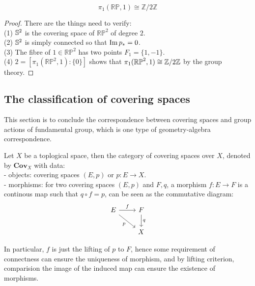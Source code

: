 \begin{corollary}
    \[\pi_1(\mathbb{RP},1) \cong \mathbb{Z}/2\mathbb{Z}\]
\end{corollary}
\begin{proof}
    There are the things need to verify:\\
    (1) \(\mathbb{S}^2\) is the covering space of \(\mathbb{RP}^2\) of degree \(2\).\\
    (2) \(\mathbb{S}^2\) is simply connected so that \(\operatorname{Im} p_* = 0\).\\
    (3) The fibre of \(1 \in \mathbb{RP}^2\) has two points \(F_1 = \{1,-1\}\).\\
    (4) \(2 = [\pi_1(\mathbb{RP}^2,1): \{0\}]\) shows that \(\pi_1(\mathbb{RP}^2,1) \cong \mathbb{Z}/2\mathbb{Z}\) by the group theory.

\end{proof}

\subsection{The classification of covering spaces}

This section is to conclude the correspondence between covering spaces and group actions of fundamental group, which is one type of geometry-algebra correspondence.

\begin{definition} 
    Let \(X\) be a toplogical space, then the category of covering spaces over \(X\), denoted by \(\mathbf{Cov}_X\)
    with data:\\

    - objects: covering spaces \((E,p)\) or \(p:E \to X\).\\

    - morphisms: for two covering spaces \((E,p)\) and \(F,q\), a morphism \(f:E \to F\) is a continous map such that \(q \circ f = p\), can be seen as the commutative diagram:
\[\begin{tikzcd}
	E & F \\
	& X
	\arrow["f", from=1-1, to=1-2]
	\arrow["p"', from=1-1, to=2-2]
	\arrow["q", from=1-2, to=2-2]
\end{tikzcd}\]
\end{definition}

In particular, \(f\) is just the lifting of \(p\) to \(F\), hence some requirement of connectness can ensure the uniqueness of morphism, and by lifting criterion, comparision the image of the induced map can ensure the existence of morphisms.

